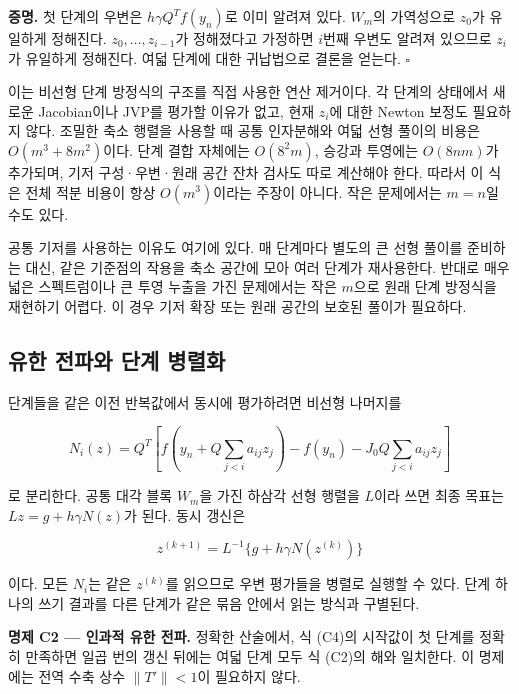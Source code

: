 \documentclass[
  10pt,
  dvipsnames]{article}
\begin{document}
\textbf{증명.} 첫 단계의 우변은 \(h\gamma Q^Tf(y_n)\)로 이미 알려져
있다. \(W_m\)의 가역성으로 \(z_0\)가 유일하게 정해진다.
\(z_0,\ldots,z_{i-1}\)가 정해졌다고 가정하면 \(i\)번째 우변도 알려져
있으므로 \(z_i\)가 유일하게 정해진다. 여덟 단계에 대한 귀납법으로 결론을
얻는다. \(\square\)

이는 비선형 단계 방정식의 구조를 직접 사용한 연산 제거이다. 각 단계의
상태에서 새로운 Jacobian이나 JVP를 평가할 이유가 없고, 현재 \(z_i\)에
대한 Newton 보정도 필요하지 않다. 조밀한 축소 행렬을 사용할 때 공통
인자분해와 여덟 선형 풀이의 비용은 \(O(m^3+8m^2)\)이다. 단계 결합
자체에는 \(O(8^2m)\), 승강과 투영에는 \(O(8nm)\)가 추가되며, 기저
구성·우변·원래 공간 잔차 검사도 따로 계산해야 한다. 따라서 이 식은 전체
적분 비용이 항상 \(O(m^3)\)이라는 주장이 아니다. 작은 문제에서는
\(m=n\)일 수도 있다.

공통 기저를 사용하는 이유도 여기에 있다. 매 단계마다 별도의 큰 선형
풀이를 준비하는 대신, 같은 기준점의 작용을 축소 공간에 모아 여러 단계가
재사용한다. 반대로 매우 넓은 스펙트럼이나 큰 투영 누출을 가진 문제에서는
작은 \(m\)으로 원래 단계 방정식을 재현하기 어렵다. 이 경우 기저 확장
또는 원래 공간의 보호된 풀이가 필요하다.

\hypertarget{uxc720uxd55c-uxc804uxd30cuxc640-uxb2e8uxacc4-uxbcd1uxb82cuxd654}{%
\subsection{유한 전파와 단계
병렬화}\label{uxc720uxd55c-uxc804uxd30cuxc640-uxb2e8uxacc4-uxbcd1uxb82cuxd654}}

단계들을 같은 이전 반복값에서 동시에 평가하려면 비선형 나머지를

\[
 N_i(z)=Q^T\!\left[f\!\left(y_n+Q\sum_{j<i}a_{ij}z_j\right)
              -f(y_n)-J_0Q\sum_{j<i}a_{ij}z_j\right]
 \tag{C3}
\]

로 분리한다. 공통 대각 블록 \(W_m\)을 가진 하삼각 선형 행렬을 \(L\)이라
쓰면 최종 목표는 \(Lz=g+h\gamma N(z)\)가 된다. 동시 갱신은

\[
 z^{(k+1)}=L^{-1}\{g+h\gamma N(z^{(k)})\}
 \tag{C4}
\]

이다. 모든 \(N_i\)는 같은 \(z^{(k)}\)를 읽으므로 우변 평가들을 병렬로
실행할 수 있다. 단계 하나의 쓰기 결과를 다른 단계가 같은 묶음 안에서
읽는 방식과 구별된다.

\textbf{명제 C2 --- 인과적 유한 전파.} 정확한 산술에서, 식 (C4)의
시작값이 첫 단계를 정확히 만족하면 일곱 번의 갱신 뒤에는 여덟 단계 모두
식 (C2)의 해와 일치한다. 이 명제에는 전역 수축 상수 \(\|T'\|<1\)이
필요하지 않다.
\end{document}
